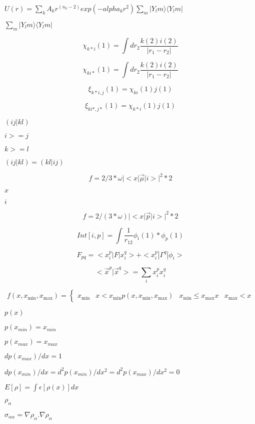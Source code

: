 \documentclass{article}
\begin{document}
$ U(r) = \sum_k A_k r^(n_k-2) exp(-alpha_k r^2) \sum_m |Y_lm \rangle \langle Y_lm| $
\pagebreak

$\sum_m |Y_lm \rangle \langle Y_lm|$
\pagebreak

\[ \chi_{k{*} i}(1) = \int dr_2 \frac{k(2) i(2)}{|r_1-r_2|} \]
\pagebreak

\[ \chi_{ki{*}}(1) = \int dr_2 \frac{k(2) i(2)}{|r_1-r_2|} \]
\pagebreak

\[ \xi_{k{*}i,j}(1) = \chi_{ki}(1) j(1) \]
\pagebreak

\[ \xi_{ki{*},j{*}}(1) = \chi_{k{*}i}(1) j(1) \]
\pagebreak

$(ij|kl)$
\pagebreak

$i>=j$
\pagebreak

$k>=l$
\pagebreak

$(ij|kl)=(kl|ij)$
\pagebreak

\[ f = 2/3 * \omega |<x | \vec \mu | i >| ^2 * 2 \]
\pagebreak

$ x $
\pagebreak

$ i $
\pagebreak

\[ f = 2/(3 * \omega) |<x | \vec p | i >| ^2 * 2 \]
\pagebreak

\[ Int[i,p] = \int \frac{1}{r_{12}} \phi_i(1) * \phi_p(1) \]
\pagebreak

\[ F_{pq} = < x^p_i | F | x^q_i > + < x^p_i | \Gamma^q | \phi_i > \]
\pagebreak

\[ < \vec x^p | \vec x^q > = \sum_i x^p_i x^q_i \]
\pagebreak

\[ f(x,x_{\mathrm{min}},x_{\mathrm{max}}) = \left\{ \begin{array}{ll} x_{\mathrm{min}} & x < x_{\mathrm{min}} p(x,x_{\mathrm{min}},x_{\mathrm{max}}) & x_{\mathrm{min}} \leq x_{\mathrm{max}} x & x_{\mathrm{max}} < x \end{array} \right. \]
\pagebreak

$p(x)$
\pagebreak

$p(x_{min})=x_{min}$
\pagebreak

$p(x_{max})=x_{max}$
\pagebreak

$dp(x_{max})/dx=1$
\pagebreak

$dp(x_{min})/dx=d^2p(x_{min})/dx^2=d^2p(x_{max})/dx^2=0$
\pagebreak

$ E[\rho] = \int \epsilon[\rho(x)] dx$
\pagebreak

$ \rho_{\alpha} $
\pagebreak

$ \sigma_{\alpha\alpha} = \nabla \rho_{\alpha}.\nabla \rho_{\alpha} $
\pagebreak
\end{document}
